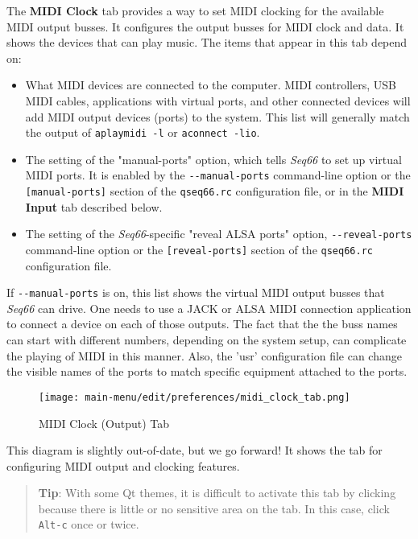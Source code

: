    The \textbf{MIDI Clock} tab provides a way to set MIDI clocking for
   the available MIDI output busses.
   It configures the output busses for MIDI clock and data.
   It shows the devices that can play music.
   The items that appear in this tab depend on:

   \begin{itemize}
      \item What MIDI devices are connected to the computer.
         MIDI controllers, USB MIDI cables, applications with virtual
         ports, and other connected devices will add MIDI
         output devices (ports) to the system.
         This list will generally match the output of \texttt{aplaymidi -l}
         or \texttt{aconnect -lio}.
      \item The setting of the "manual-ports" option, which tells
         \textsl{Seq66} to set up virtual MIDI ports.
         It is enabled by the
         \texttt{-{}-manual-ports} command-line option or the
         \texttt{[manual-ports]} section of the
         \texttt{qseq66.rc} configuration file,
         or in the \textbf{MIDI Input} tab described below.
      \item The setting of the \textsl{Seq66}-specific
         "reveal ALSA ports" option,
         \texttt{-{}-reveal-ports} command-line option or the
         \texttt{[reveal-ports]} section of the
         \texttt{qseq66.rc} configuration file.
   \end{itemize}

   If \texttt{-{}-manual-ports} is on, this list shows the virtual
   MIDI output busses that \textsl{Seq66} can drive.
   One needs to use a JACK or ALSA MIDI
   connection application to connect a device on each of those outputs.
   The fact that the the buss names can
   start with different numbers, depending on the system setup, can complicate
   the playing of MIDI in this manner.  Also, the 'usr' configuration file can
   change the visible names of the ports to match specific equipment attached
   to the ports.

\begin{figure}[H]
   \centering 
   \texttt{[image: main-menu/edit/preferences/midi\_clock\_tab.png]}
   \caption{MIDI Clock (Output) Tab}
   \label{fig:midi_clock_tab}
\end{figure}

   This diagram is slightly out-of-date, but we go forward!
   It shows the tab for configuring MIDI output and clocking features.

   \begin{quotation}
      \textbf{Tip}:
      With some Qt themes, it is difficult to activate this tab by clicking
      because there is little or no sensitive area on the tab.
      In this case, click \texttt{Alt-c} once or twice.
   \end{quotation}

